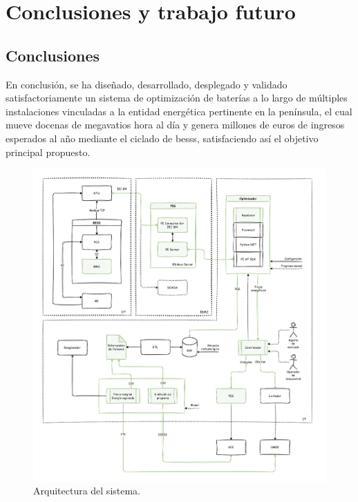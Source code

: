 \cleardoublepage%

\chapter{Conclusiones y trabajo futuro}%
\label{makereference8}

\section{Conclusiones}%
\label{makereference8.1}

En conclusión, se ha diseñado, desarrollado, desplegado y validado satisfactoriamente un sistema de optimización de baterías a lo largo de múltiples instalaciones vinculadas a la entidad energética pertinente en la península, el cual mueve docenas de megavatios hora al día y genera millones de euros de ingresos esperados al año mediante el ciclado de \glspl{bess}, satisfaciendo así el objetivo principal propuesto.

\begin{figure}
  \centering
  \includegraphics[width=\linewidth]{figures/arquitectura.png}
  \caption[Arquitectura del sistema.]{Arquitectura del sistema.}%
  \label{fig:arquitectura}
\end{figure}

